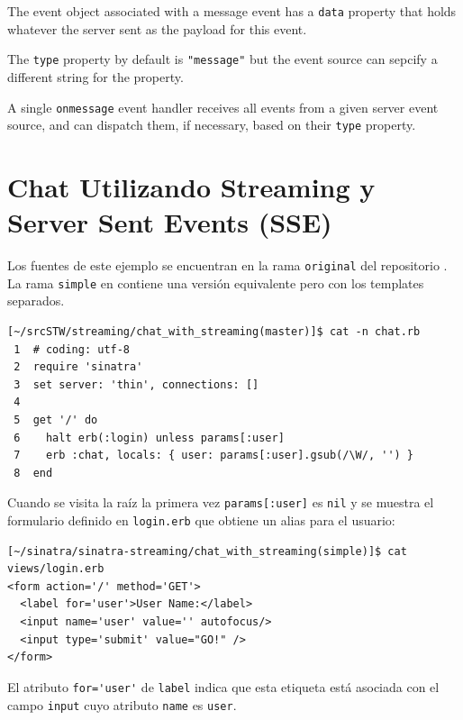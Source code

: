 The event object associated with a message event has a \verb|data| property
that holds whatever the server sent as the payload for this event.

The \verb|type| property by default is \verb|"message"| but the event source 
can sepcify a different string for the property.

A single \verb|onmessage| event handler receives all events from a given server event
source, and can dispatch them, if necessary, based on their \verb|type| property.

\section{Chat Utilizando Streaming y Server Sent Events (SSE)}
\label{section:chatutilizandostreaming}


Los fuentes de este ejemplo se encuentran en la rama \verb|original| del repositorio
.
La rama \verb|simple| en
contiene una versión equivalente pero con los templates separados.

\begin{verbatim}
[~/srcSTW/streaming/chat_with_streaming(master)]$ cat -n chat.rb 
 1  # coding: utf-8
 2  require 'sinatra'
 3  set server: 'thin', connections: []
 4  
 5  get '/' do
 6    halt erb(:login) unless params[:user]
 7    erb :chat, locals: { user: params[:user].gsub(/\W/, '') }
 8  end
\end{verbatim}
Cuando se visita la raíz la primera vez \verb|params[:user]| es \verb|nil|
y se muestra el formulario definido en \verb|login.erb| que obtiene un alias
para el usuario:
\begin{verbatim}
[~/sinatra/sinatra-streaming/chat_with_streaming(simple)]$ cat views/login.erb 
<form action='/' method='GET'>
  <label for='user'>User Name:</label>
  <input name='user' value='' autofocus/>
  <input type='submit' value="GO!" />
</form>
\end{verbatim}
El atributo \verb|for='user'| de \verb|label| indica que esta etiqueta está asociada
con el campo \verb|input| cuyo atributo \verb|name| es \verb|user|.


